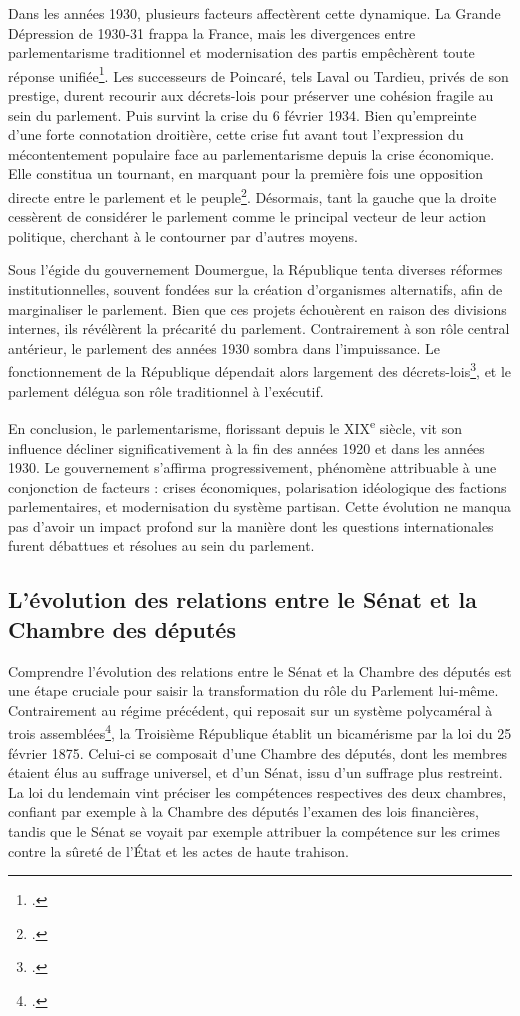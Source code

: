 \documentclass[a4paper,twoside,12pt]{book}
\begin{document}
Dans les années 1930, plusieurs facteurs affectèrent cette dynamique. La Grande Dépression de 1930-31 frappa la France, mais les divergences entre parlementarisme traditionnel et modernisation des partis empêchèrent toute réponse unifiée\footcite[p.352]{zotero-515}. Les successeurs de Poincaré, tels Laval ou Tardieu, privés de son prestige, durent recourir aux décrets-lois pour préserver une cohésion fragile au sein du parlement. Puis survint la crise du 6 février 1934. Bien qu'empreinte d'une forte connotation droitière, cette crise fut avant tout l'expression du mécontentement populaire face au parlementarisme depuis la crise économique. Elle constitua un tournant, en marquant pour la première fois une opposition directe entre le parlement et le peuple\footcite[p.356]{zotero-515}. Désormais, tant la gauche que la droite cessèrent de considérer le parlement comme le principal vecteur de leur action politique, cherchant à le contourner par d'autres moyens.

Sous l'égide du gouvernement Doumergue, la République tenta diverses réformes institutionnelles, souvent fondées sur la création d'organismes alternatifs, afin de marginaliser le parlement. Bien que ces projets échouèrent en raison des divisions internes, ils révélèrent la précarité du parlement. Contrairement à son rôle central antérieur, le parlement des années 1930 sombra dans l'impuissance. Le fonctionnement de la République dépendait alors largement des décrets-lois\footcite[p.365]{zotero-515}, et le parlement délégua son rôle traditionnel à l'exécutif.

En conclusion, le parlementarisme, florissant depuis le XIX\textsuperscript{e} siècle, vit son influence décliner significativement à la fin des années 1920 et dans les années 1930. Le gouvernement s'affirma progressivement, phénomène attribuable à une conjonction de facteurs : crises économiques, polarisation idéologique des factions parlementaires, et modernisation du système partisan. Cette évolution ne manqua pas d'avoir un impact profond sur la manière dont les questions internationales furent débattues et résolues au sein du parlement.


\subsection{L'évolution des relations entre le Sénat et la Chambre des députés}
Comprendre l'évolution des relations entre le Sénat et la Chambre des députés est une étape cruciale pour saisir la transformation du rôle du Parlement lui-même. Contrairement au régime précédent, qui reposait sur un système polycaméral à trois assemblées\footcite[p.167]{morel2024}, la Troisième République établit un bicamérisme par la loi du 25 février 1875. Celui-ci se composait d'une Chambre des députés, dont les membres étaient élus au suffrage universel, et d'un Sénat, issu d'un suffrage plus restreint. La loi du lendemain vint préciser les compétences respectives des deux chambres, confiant par exemple à la Chambre des députés l'examen des lois financières, tandis que le Sénat se voyait par exemple attribuer la compétence sur les crimes contre la sûreté de l'État et les actes de haute trahison.
\end{document}

